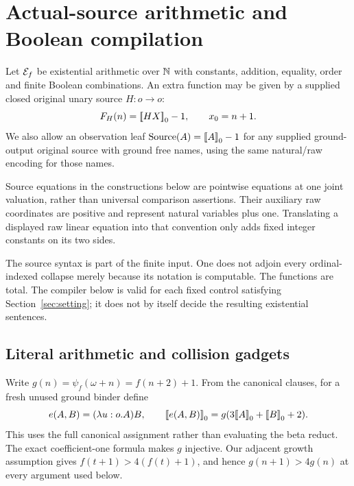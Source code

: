 \section{Actual-source arithmetic and Boolean compilation}\label{sec:source-arithmetic}

\begin{definition}\label{def:source-language}
Let $\mathcal E_f$ be existential arithmetic over $\mathbb N$ with constants, addition,
equality, order and finite Boolean combinations.  An extra function may be
given by a supplied closed original unary source $H:o\to o$:
\[
 F_H(n)=\mathopen{[\![}HX\mathclose{]\!]}_0-1,\qquad x_0=n+1.
\]
We also allow an observation leaf $\operatorname{Source}(A)=\mathopen{[\![}A\mathclose{]\!]}_0-1$
for any supplied ground-output original source with ground free names,
using the same natural/raw encoding for those names.
\end{definition}

Source equations in the constructions below are pointwise equations
at one joint valuation, rather than universal comparison assertions.
Their auxiliary raw coordinates are positive and represent natural
variables plus one. Translating a displayed raw linear equation into
that convention only adds fixed integer constants on its two sides.

The source syntax is part of the finite input.  One does not adjoin every
ordinal-indexed collapse merely because its notation is computable.  The functions are total. The compiler below is valid for each fixed
control satisfying Section~\ref{sec:setting}; it does not by itself
decide the resulting existential sentences.

\subsection{Literal arithmetic and collision gadgets}\label{sec:gadgets}

Write $g(n)=\psi_f(\omega+n)=f(n+2)+1$.  From the canonical clauses,
for a fresh unused ground binder define
\[
 e(A,B)=(\lambda u:o.A)B,\qquad
 \mathopen{[\![}e(A,B)\mathclose{]\!]}_0=g(3\mathopen{[\![}A\mathclose{]\!]}_0+\mathopen{[\![}B\mathclose{]\!]}_0+2).
\]
This uses the full canonical assignment rather than evaluating the beta
reduct.  The exact coefficient-one formula makes $g$ injective. Our adjacent
growth assumption gives $f(t+1)>4(f(t)+1)$, and hence
$g(n+1)>4g(n)$ at every argument used below.

